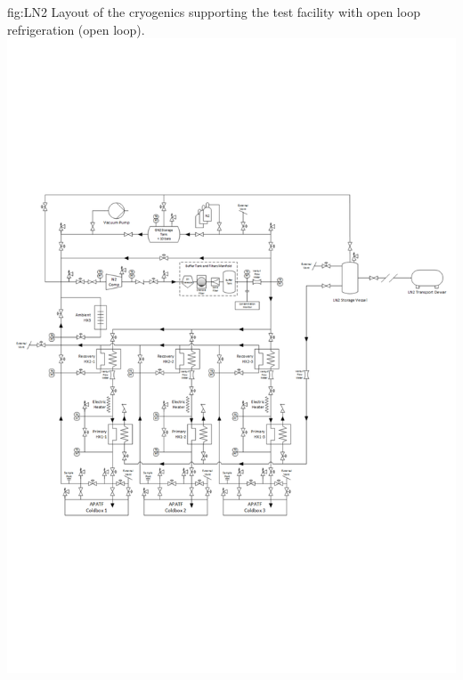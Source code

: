 \begin{dunefigure}{fig:LN2}
  {Layout of the cryogenics supporting the  test facility with open loop refrigeration (open loop).}
\includegraphics[width=.98\textwidth]{graphics/Cryo-cold-box-LN2.pdf}
\end{dunefigure}



